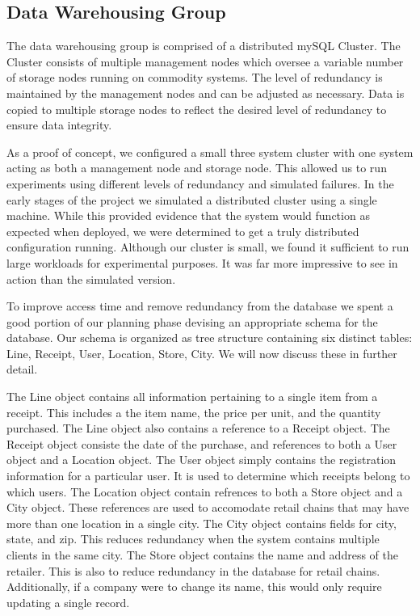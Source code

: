 \subsection{Data Warehousing Group}
\label{sec:implementation.db}

The data warehousing group is comprised of a distributed mySQL
Cluster.  The Cluster consists of multiple management nodes which
oversee a variable number of storage nodes running on commodity
systems.  The level of redundancy is maintained by the management
nodes and can be adjusted as necessary.  Data is copied to multiple
storage nodes to reflect the desired level of redundancy to ensure
data integrity.

As a proof of concept, we configured a small three system cluster with
one system acting as both a management node and storage node.  This
allowed us to run experiments using different levels of redundancy and
simulated failures.  In the early stages of the project we simulated a
distributed cluster using a single machine.  While this provided
evidence that the system would function as expected when deployed, we
were determined to get a truly distributed configuration running.
Although our cluster is small, we found it sufficient to run large
workloads for experimental purposes.  It was far more impressive to
see in action than the simulated version.

To improve access time and remove redundancy from the database we
spent a good portion of our planning phase devising an appropriate
schema for the database.  Our schema is organized as tree structure
containing six distinct tables: Line, Receipt, User, Location, Store,
City.  We will now discuss these in further detail.

The Line object contains all information pertaining to a single item
from a receipt.  This includes a the item name, the price per unit,
and the quantity purchased.  The Line object also contains a reference
to a Receipt object.  The Receipt object consiste the date of the
purchase, and references to both a User object and a Location object.
The User object simply contains the registration information for a
particular user.  It is used to determine which receipts belong to
which users.  The Location object contain refrences to both a Store
object and a City object.  These references are used to accomodate
retail chains that may have more than one location in a single city.
The City object contains fields for city, state, and zip.  This
reduces redundancy when the system contains multiple clients in the
same city.  The Store object contains the name and address of the
retailer.  This is also to reduce redundancy in the database for
retail chains.  Additionally, if a company were to change its name,
this would only require updating a single record.

